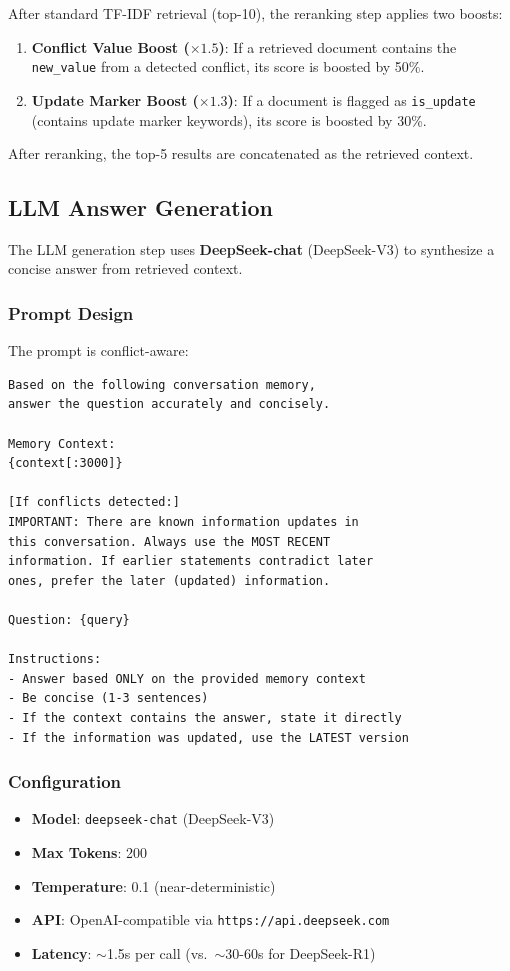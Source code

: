 \documentclass[11pt,a4paper]{article}
\begin{document}
After standard TF-IDF retrieval (top-10), the reranking step applies two boosts:

\begin{enumerate}
    \item \textbf{Conflict Value Boost ($\times 1.5$)}: If a retrieved document contains the \texttt{new\_value} from a detected conflict, its score is boosted by 50\%.
    \item \textbf{Update Marker Boost ($\times 1.3$)}: If a document is flagged as \texttt{is\_update} (contains update marker keywords), its score is boosted by 30\%.
\end{enumerate}

After reranking, the top-5 results are concatenated as the retrieved context.

\subsection{LLM Answer Generation}

The LLM generation step uses \textbf{DeepSeek-chat} (DeepSeek-V3) to synthesize a concise answer from retrieved context.

\subsubsection{Prompt Design}
The prompt is conflict-aware:
\begin{lstlisting}[language={},frame=single]
Based on the following conversation memory, 
answer the question accurately and concisely.

Memory Context:
{context[:3000]}

[If conflicts detected:]
IMPORTANT: There are known information updates in 
this conversation. Always use the MOST RECENT 
information. If earlier statements contradict later 
ones, prefer the later (updated) information.

Question: {query}

Instructions:
- Answer based ONLY on the provided memory context
- Be concise (1-3 sentences)
- If the context contains the answer, state it directly
- If the information was updated, use the LATEST version
\end{lstlisting}

\subsubsection{Configuration}
\begin{itemize}
    \item \textbf{Model}: \texttt{deepseek-chat} (DeepSeek-V3)
    \item \textbf{Max Tokens}: 200
    \item \textbf{Temperature}: 0.1 (near-deterministic)
    \item \textbf{API}: OpenAI-compatible via \texttt{https://api.deepseek.com}
    \item \textbf{Latency}: $\sim$1.5s per call (vs.\ $\sim$30-60s for DeepSeek-R1)
\end{itemize}
\end{document}
